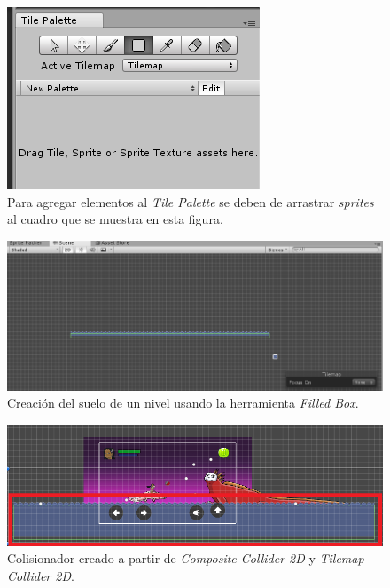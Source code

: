 \begin{figure}[h]
        \centering
        \includegraphics[height=0.2 \textheight]{03TrabajoRealizado/imagenes/createTilemap08.png}
        \caption{Para agregar elementos al \textit{Tile Palette} se deben de arrastrar \textit{sprites} al cuadro que se muestra en esta figura.}
        \label{fig:TileMaps03}
\end{figure}

\begin{figure}[h]
        \centering
        \includegraphics[height=0.2 \textheight]{03TrabajoRealizado/imagenes/createTilemap04.png}
        \caption{Creación del suelo de un nivel usando la herramienta \textit{Filled
        Box}.}
        \label{fig:TileMaps04}
\end{figure}

\begin{figure}[h]
        \centering
        \includegraphics[height=0.2 \textheight]{03TrabajoRealizado/imagenes/cronfigurationTilemap04.png}
        \caption{Colisionador creado a partir de \textit{Composite Collider 2D} y
        \textit{Tilemap Collider 2D}.}
        \label{fig:TileMaps05}
\end{figure}


